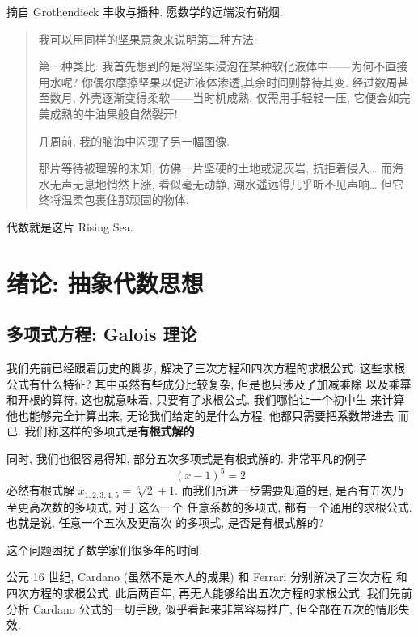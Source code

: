 \documentclass[UTF8]{book}
\begin{document}
\vspace*{5em}

摘自 Grothendieck 丰收与播种. 愿数学的远端没有硝烟. 

\begin{quotation}
    
    \kaishu   
    我可以用同样的坚果意象来说明第二种方法: 
    
    第一种类比: 
    我首先想到的是将坚果浸泡在某种软化液体中——为何不直接用水呢? 
    你偶尔摩擦坚果以促进液体渗透,其余时间则静待其变. 
    经过数周甚至数月, 外壳逐渐变得柔软——当时机成熟, 仅需用手轻轻一压, 
    它便会如完美成熟的牛油果般自然裂开! 

    几周前, 我的脑海中闪现了另一幅图像. 
      
    那片等待被理解的未知, 仿佛一片坚硬的土地或泥灰岩, 抗拒着侵入\dots
    而海水无声无息地悄然上涨, 看似毫无动静, 潮水遥远得几乎听不见声响\dots 
    但它终将温柔包裹住那顽固的物体. 
    
\end{quotation}

代数就是这片 Rising Sea. 

\setcounter{chapter}{1}
\chapter{绪论: 抽象代数思想}
\section{多项式方程: Galois 理论}

我们先前已经跟着历史的脚步, 解决了三次方程和四次方程的求根公式. 
这些求根公式有什么特征? 其中虽然有些成分比较复杂, 但是也只涉及了加减乘除
以及乘幂和开根的算符, 这也就意味着, 只要有了求根公式, 我们哪怕让一个初中生
来计算他也能够完全计算出来, 无论我们给定的是什么方程, 他都只需要把系数带进去
而已. 我们称这样的多项式是\textbf{有根式解的}. 

同时, 我们也很容易得知, 部分五次多项式是有根式解的. 
非常平凡的例子
$$ (x-1)^5 = 2 $$
必然有根式解 $ x_{1,2,3,4,5} = \sqrt[5]{2}+1$. 
而我们所进一步需要知道的是, 是否有五次乃至更高次数的多项式, 对于这么一个
任意系数的多项式, 都有一个通用的求根公式. 也就是说, 任意一个五次及更高次
的多项式, 是否是有根式解的? 

这个问题困扰了数学家们很多年的时间. 

公元 16 世纪, Cardano (虽然不是本人的成果) 和 Ferrari 分别解决了三次方程
和四次方程的求根公式. 此后两百年, 再无人能够给出五次方程的求根公式. 
我们先前分析 Cardano 公式的一切手段, 似乎看起来非常容易推广, 
但全部在五次的情形失效. 
\end{document}
